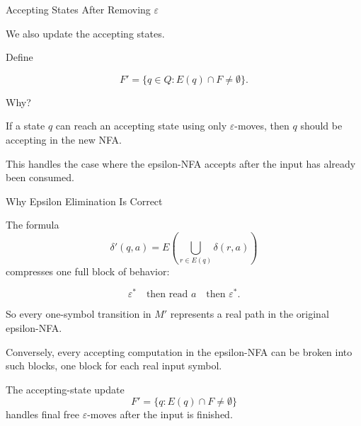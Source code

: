 \documentclass[10pt,aspectratio=169]{beamer}
\newcommand{\eps}{\varepsilon}
\begin{document}
\begin{frame}{Accepting States After Removing \(\eps\)}

We also update the accepting states.

\vspace{0.8em}

Define

\[
F'=\{q\in Q: E(q)\cap F\neq \emptyset\}.
\]

\vspace{0.8em}

Why?

\pause

If a state \(q\) can reach an accepting state using only \(\eps\)-moves, then \(q\) should be accepting in the new NFA.

\vspace{0.8em}

This handles the case where the epsilon-NFA accepts after the input has already been consumed.

\end{frame}

\begin{frame}{Why Epsilon Elimination Is Correct}

\small
The formula
\[
\delta'(q,a)
=
E\left(\bigcup_{r\in E(q)}\delta(r,a)\right)
\]
compresses one full block of behavior:

\[
\eps^*
\quad\text{then read }a\quad
\text{then }\eps^*.
\]

\vspace{0.7em}
So every one-symbol transition in \(M'\) represents a real path in the original epsilon-NFA.

\vspace{0.7em}
Conversely, every accepting computation in the epsilon-NFA can be broken into such blocks, one block for each real input symbol.

\vspace{0.7em}
The accepting-state update
\[
F'=\{q:E(q)\cap F\neq\emptyset\}
\]
handles final free \(\eps\)-moves after the input is finished.

\end{frame}
\end{document}
